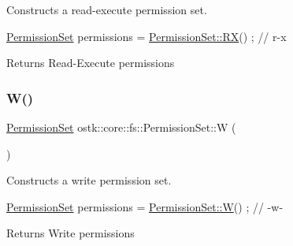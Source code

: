 Constructs a read-\/execute permission set. 


\begin{DoxyCode}
\hyperlink{classostk_1_1core_1_1fs_1_1_permission_set_a31c918014e874ceac487e92d0d3ac5a2}{PermissionSet} permissions = \hyperlink{classostk_1_1core_1_1fs_1_1_permission_set_a42a72499579b9639c112613effb2c128}{PermissionSet::RX}() ; \textcolor{comment}{// r-x}
\end{DoxyCode}


\begin{DoxyReturn}{Returns}
Read-\/\+Execute permissions 
\end{DoxyReturn}
\mbox{\label{classostk_1_1core_1_1fs_1_1_permission_set_ae2deeea4e01dc2b294710d3e223be602}} 
\subsubsection{\texorpdfstring{W()}{W()}}
{\footnotesize\ttfamily \hyperlink{classostk_1_1core_1_1fs_1_1_permission_set}{Permission\+Set} ostk\+::core\+::fs\+::\+Permission\+Set\+::W (\begin{DoxyParamCaption}{ }\end{DoxyParamCaption})\hspace{0.3cm}{\ttfamily [static]}}



Constructs a write permission set. 


\begin{DoxyCode}
\hyperlink{classostk_1_1core_1_1fs_1_1_permission_set_a31c918014e874ceac487e92d0d3ac5a2}{PermissionSet} permissions = \hyperlink{classostk_1_1core_1_1fs_1_1_permission_set_ae2deeea4e01dc2b294710d3e223be602}{PermissionSet::W}() ; \textcolor{comment}{// -w-}
\end{DoxyCode}


\begin{DoxyReturn}{Returns}
Write permissions 
\end{DoxyReturn}
\mbox{\label{classostk_1_1core_1_1fs_1_1_permission_set_ac84670d9520228b38bb8555b7f1e399f}} 
